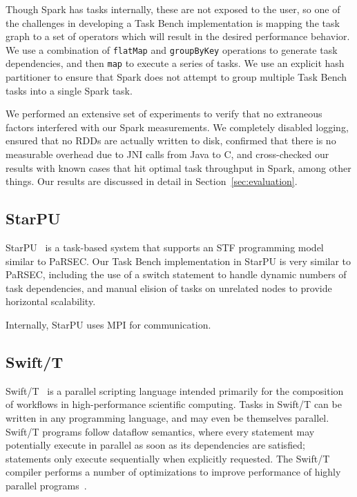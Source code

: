 Though Spark has tasks internally, these are not exposed to the user,
so one of the challenges in developing a Task Bench implementation is
mapping the task graph to a set of operators which will result in the
desired performance behavior. We use a combination of
\lstinline[language=Scala]{flatMap} and
\lstinline[language=Scala]{groupByKey} operations to generate task
dependencies, and then \lstinline[language=Scala]{map} to execute a
series of tasks. We use an explicit hash partitioner to ensure that
Spark does not attempt to group multiple Task Bench tasks into a
single Spark task.

We performed an extensive set of experiments to verify that no
extraneous factors interfered with our Spark measurements. We
completely disabled logging, ensured that no RDDs are actually written
to disk, confirmed that there is no measurable overhead due to JNI
calls from Java to C, and cross-checked our results with known cases
that hit optimal task throughput in Spark, among other things. Our
results are discussed in detail in Section~\ref{sec:evaluation}.

\subsection{StarPU}

StarPU~\cite{StarPU11} is a task-based system that supports an STF
programming model similar to PaRSEC. Our Task Bench implementation in
StarPU is very similar to PaRSEC, including the use of a switch
statement to handle dynamic numbers of task dependencies, and manual
elision of tasks on unrelated nodes to provide horizontal scalability.

Internally, StarPU uses MPI for communication.

\subsection{Swift/T}

Swift/T~\cite{Wozniak13} is a parallel scripting language intended
primarily for the composition of workflows in high-performance
scientific computing. Tasks in Swift/T can be written in any
programming language, and may even be themselves parallel. Swift/T
programs follow dataflow semantics, where every statement may
potentially execute in parallel as soon as its dependencies are
satisfied; statements only execute sequentially when explicitly
requested. The Swift/T compiler performs a number of optimizations to
improve performance of highly parallel programs~\cite{Armstrong14}.

